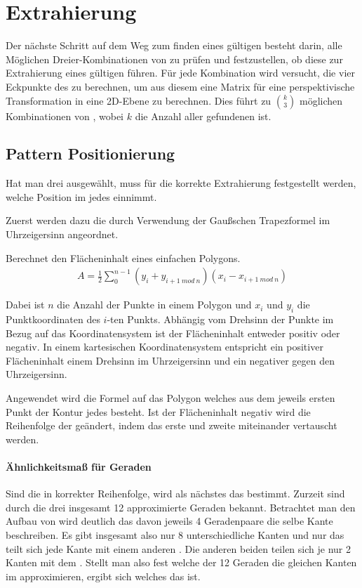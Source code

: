 \chapter{Extrahierung}

Der nächste Schritt auf dem Weg zum finden eines gültigen \QRCodes besteht darin, alle Möglichen Dreier-Kombinationen von \fps zu prüfen und festzustellen, ob diese zur Extrahierung eines gültigen \QRCodes führen. Für jede Kombination wird versucht, die vier Eckpunkte des \QRCodes zu berechnen, um aus diesem eine Matrix für eine perspektivische Transformation in eine 2D-Ebene zu berechnen. Dies führt zu $\binom{k}{3}$ möglichen Kombinationen von \fps, wobei $k$ die Anzahl aller gefundenen \fps ist.

\section{Pattern Positionierung}
Hat man drei \fps ausgewählt, muss für die korrekte Extrahierung festgestellt werden, welche Position im \QRCode jedes \fp einnimmt.

Zuerst werden dazu die \fps durch Verwendung der Gaußschen Trapezformel im Uhrzeigersinn angeordnet.
\begin{theorem}
Berechnet den Flächeninhalt eines einfachen Polygons.
\begin{align}
A=\frac{1}{2} \sum_{0}^{n-1} (y_i + y_{i+1\ mod\ n})(x_i - x_{i+1\ mod\ n})
\end{align}
\end{theorem}
Dabei ist $n$ die Anzahl der Punkte in einem Polygon und $x_i$ und $y_i$ die Punktkoordinaten des $i$-ten Punkts. Abhängig vom Drehsinn der Punkte im Bezug auf das Koordinatensystem ist der Flächeninhalt entweder positiv oder negativ. In einem kartesischen Koordinatensystem entspricht ein positiver Flächeninhalt einem Drehsinn im Uhrzeigersinn und ein negativer gegen den Uhrzeigersinn.

Angewendet wird die Formel auf das Polygon welches aus dem jeweils ersten Punkt der Kontur jedes \fps besteht. Ist der Flächeninhalt negativ wird die Reihenfolge der \fps geändert, indem das erste und zweite \fp miteinander vertauscht werden.
\subsubsection{Ähnlichkeitsmaß für Geraden}
Sind die \fps in korrekter Reihenfolge, wird als nächstes das \olfp bestimmt. Zurzeit sind durch die drei \fps insgesamt 12 approximierte Geraden bekannt. Betrachtet man den Aufbau von \QRCodes wird deutlich das davon jeweils 4 Geradenpaare die selbe Kante beschreiben. Es gibt insgesamt also nur 8 unterschiedliche Kanten und nur das \olfp teilt sich jede Kante mit einem anderen \fp. Die anderen beiden \fps teilen sich je nur 2 Kanten mit dem \olfp. Stellt man also fest welche der 12 Geraden die gleichen Kanten im \QRCode approximieren, ergibt sich welches \fp das \olfp ist.

